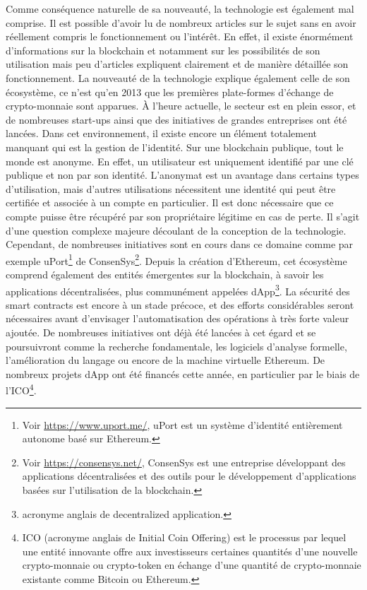 \documentclass{tnreport}
\begin{document}
Comme conséquence naturelle de sa nouveauté, la technologie est également mal comprise.
Il est possible d'avoir lu de nombreux articles sur le sujet sans en avoir réellement compris le fonctionnement ou l'intérêt.
En effet, il existe énormément d'informations sur la blockchain et notamment sur les possibilités de son utilisation mais peu d'articles expliquent clairement et de manière détaillée son fonctionnement.
La nouveauté de la technologie explique également celle de son écosystème, ce n'est qu'en 2013 que les premières plate-formes d'échange de crypto-monnaie sont apparues.
À l'heure actuelle, le secteur est en plein essor, et de nombreuses start-ups ainsi que des initiatives de grandes entreprises ont été lancées.
Dans cet environnement, il existe encore un élément totalement manquant qui est la gestion de l'identité.
Sur une blockchain publique, tout le monde est anonyme. En effet, un utilisateur est uniquement identifié par une clé publique et non par son identité.
L'anonymat est un avantage dans certains types d'utilisation, mais d'autres utilisations nécessitent une identité qui peut être certifiée et associée à un compte en particulier. Il est donc nécessaire que ce compte puisse être récupéré par son propriétaire légitime en cas de perte.
Il s'agit d'une question complexe majeure découlant de la conception de la technologie. Cependant, de nombreuses initiatives sont en cours dans ce domaine comme par exemple uPort\footnote{Voir \url{https://www.uport.me/}, uPort est un système d'identité entièrement autonome basé sur Ethereum.} de ConsenSys\footnote{Voir \url{https://consensys.net/}, ConsenSys est une entreprise développant des applications décentralisées et des outils pour le développement d'applications basées sur l'utilisation de la blockchain.}.
Depuis la création d'Ethereum, cet écosystème comprend également des entités émergentes sur la blockchain, à savoir les applications décentralisées, plus communément appelées dApp\footnote{acronyme anglais de decentralized application.}.
La sécurité des smart contracts est encore à un stade précoce, et des efforts considérables seront nécessaires avant d'envisager l'automatisation des opérations à très forte valeur ajoutée.
De nombreuses initiatives ont déjà été lancées à cet égard et se poursuivront comme la recherche fondamentale, les logiciels d'analyse formelle, l'amélioration du langage ou encore de la machine virtuelle Ethereum.
De nombreux projets dApp ont été financés cette année, en particulier par le biais de l'ICO\footnote{
ICO (acronyme anglais de Initial Coin Offering) est le processus par lequel une entité innovante offre aux investisseurs certaines quantités d'une nouvelle crypto-monnaie ou crypto-token en échange d'une quantité de crypto-monnaie existante comme Bitcoin ou Ethereum.}.
\end{document}
